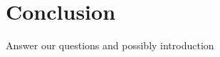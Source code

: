 \documentclass{article}
\begin{document}
\section{Conclusion} %
Answer our questions and possibly introduction



\end{document}
